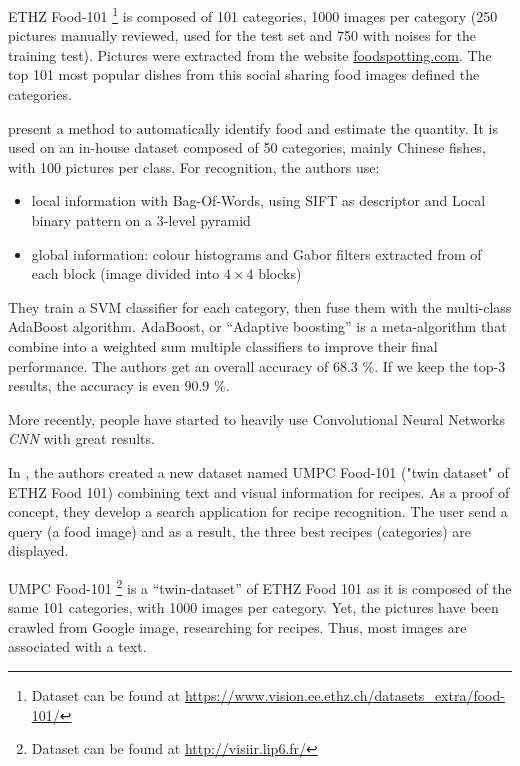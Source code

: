 ETHZ Food-101 \footnote{Dataset can be found at  \url{https://www.vision.ee.ethz.ch/datasets_extra/food-101/}} is composed of 101 categories, 1000 images per category (250 pictures manually reviewed, used for the test set and 750 with noises for the training test). Pictures were extracted from the website \href{http://www.foodspotting.com/}{foodspotting.com}. The top 101 most popular dishes from this social sharing food images defined the categories.


\cite{Chen2012} present a method to automatically identify food and estimate the quantity. It is used on an in-house dataset composed of 50 categories, mainly Chinese fishes, with 100 pictures per class. For recognition, the authors use:
\begin{itemize}
    \item local information with Bag-Of-Words, using SIFT as descriptor and Local binary pattern on a 3-level pyramid
    \item global information: colour histograms and Gabor filters extracted from of each block (image divided into $4 \times 4$ blocks)
\end{itemize}

They train a SVM classifier for each category, then fuse them with the multi-class AdaBoost algorithm. AdaBoost, or \enquote{Adaptive boosting} is a meta-algorithm that combine into a weighted sum multiple classifiers to improve their final performance.
The authors get an overall accuracy of 68.3 \%. If we keep the top-3 results, the accuracy is even 90.9 \%.



More recently, people have started to heavily use Convolutional Neural Networks \textit{CNN} with great results.


In \cite{Wang2015}, the authors created a new dataset named UMPC Food-101 ("twin dataset" of ETHZ Food 101) combining text and visual information for recipes. As a proof of concept, they develop a search application for recipe recognition. The user send a query (a food image) and as a result, the three best recipes (categories) are displayed.

UMPC Food-101 \footnote{Dataset can be found at \url{http://visiir.lip6.fr/}} is a \enquote{twin-dataset} of ETHZ Food 101 as it is composed of the same 101 categories, with 1000 images per category. Yet, the pictures have been crawled from Google image, researching for recipes. Thus, most images are associated with a text.

